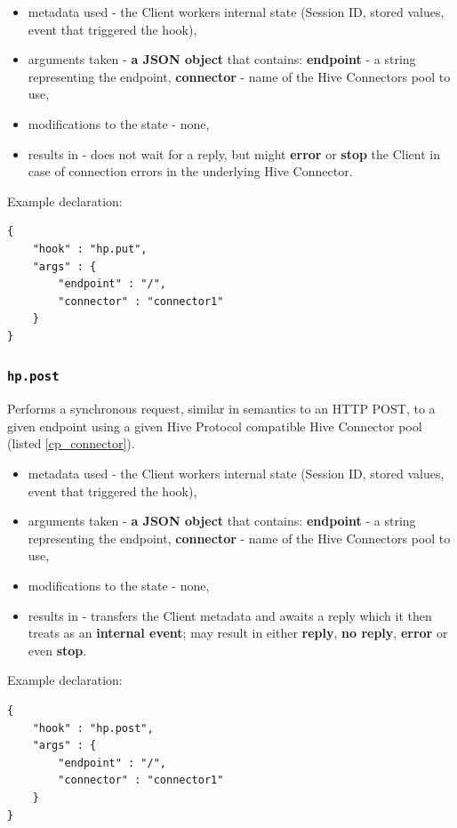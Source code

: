 \documentclass[a4paper]{article}
\begin{document}
\begin{itemize}
\item metadata used - the Client workers internal state (Session ID, stored values, event that triggered the hook),
\item arguments taken - \textbf{a JSON object} that contains: \textbf{endpoint} - a string representing the endpoint, \textbf{connector} - name of the Hive Connectors pool to use,
\item modifications to the state - none,
\item results in - does not wait for a reply, but might \textbf{error} or \textbf{stop} the Client in case of connection errors in the underlying Hive Connector.
\end{itemize}

\noindent
Example declaration:

\begin{verbatim}
{
    "hook" : "hp.put",
    "args" : {
        "endpoint" : "/",
        "connector" : "connector1"
    }
}
\end{verbatim}
\subsubsection{\texttt{hp.post}}
\label{sec-8-2-9}

Performs a synchronous request, similar in semantics to an HTTP POST, to a given endpoint using a given Hive Protocol compatible Hive Connector pool (listed \ref{cp_connector}).


\begin{itemize}
\item metadata used - the Client workers internal state (Session ID, stored values, event that triggered the hook),
\item arguments taken - \textbf{a JSON object} that contains: \textbf{endpoint} - a string representing the endpoint, \textbf{connector} - name of the Hive Connectors pool to use,
\item modifications to the state - none,
\item results in -  transfers the Client metadata and awaits a reply which it then treats as an \textbf{internal event}; may result in either \textbf{reply}, \textbf{no reply}, \textbf{error} or even \textbf{stop}.
\end{itemize}

\noindent
Example declaration:

\begin{verbatim}
{
    "hook" : "hp.post",
    "args" : {
        "endpoint" : "/",
        "connector" : "connector1"
    }
}
\end{verbatim}
\end{document}
